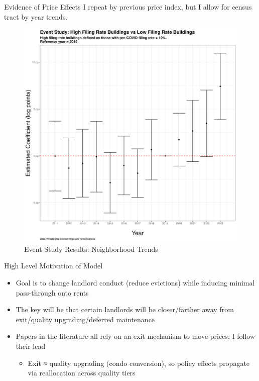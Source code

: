\documentclass[10pt, xcolor=dvipsnames]{beamer}
\begin{document}
\begin{frame}{Evidence of Price Effects}
    I repeat by previous price index, but I allow for census tract by year trends.
    \begin{figure}
        \centering
        \includegraphics[width=0.75\linewidth]{figs/event_study_high_filing_2019_nhood_trends.png}
        \caption{Event Study Results: Neighborhood Trends}
        \label{fig:placeholder}
    \end{figure}
    
\end{frame}


\begin{frame}{High Level Motivation of Model}
\begin{itemize}
    \item Goal is to change landlord conduct (reduce evictions) while inducing minimal pass-through onto rents
    \item The key will be that certain landlords will be closer/farther away from exit/quality upgrading/deferred maintenance 
    \item Papers in the literature \cite{diamond-2019, collinson2024eviction, } all rely on an exit mechanism to move prices; I follow their lead
    \begin{itemize}
        \item Exit ≈ quality upgrading (condo conversion), so policy effects propagate via reallocation across quality tiers
    \end{itemize}
\end{itemize}
    
\end{frame}
\end{document}
